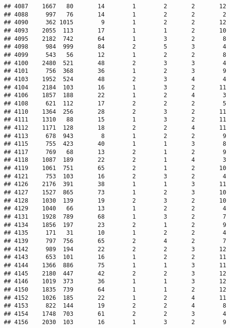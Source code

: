 \documentclass[]{article}
\begin{document}
\begin{verbatim}
## 4087    1667   80       14        1        2       2       12
## 4088     997   76       14        1        2       2        2
## 4090     362 1015        9        1        2       2       12
## 4093    2055  113       17        1        1       2       10
## 4095    2182  742       64        1        3       2        8
## 4098     984  999       84        2        5       3        4
## 4099     543   56       12        1        2       2        8
## 4100    2480  521       48        2        3       3        4
## 4101     756  368       36        1        2       3        9
## 4103    1952  524       48        2        3       4        4
## 4104    2184  103       16        1        3       2       11
## 4106    1857  188       22        1        2       4        3
## 4108     621  112       17        2        2       2        5
## 4110    1364  256       28        2        3       2       11
## 4111    1310   88       15        1        3       2       11
## 4112    1171  128       18        2        2       4       11
## 4113     678  943        8        1        2       2        9
## 4115     755  423       40        1        1       3        8
## 4117     769   68       13        2        1       2        9
## 4118    1087  189       22        2        1       4        3
## 4119    1061  751       65        2        1       2       10
## 4121     753  103       16        2        3       2        4
## 4126    2176  391       38        1        1       3       11
## 4127    1527  865       73        1        2       3       10
## 4128    1030  139       19        2        3       2       10
## 4129    1040   66       13        1        2       2        4
## 4131    1928  789       68        1        3       2        7
## 4134    1856  197       23        2        1       2        9
## 4135     171   31       10        1        2       2        4
## 4139     797  756       65        2        4       2        7
## 4142     989  194       22        2        2       3       12
## 4143     653  101       16        1        2       2       11
## 4144    1366  886       75        1        1       3       11
## 4145    2180  447       42        2        2       3       12
## 4146    1019  373       36        1        1       3       12
## 4150    1835  739       64        1        1       2       12
## 4152    1026  185       22        1        2       4       11
## 4153     822  144       19        2        2       4        8
## 4154    1748  703       61        2        2       3        4
## 4156    2030  103       16        1        3       2        9

\end{verbatim}
\end{document}
